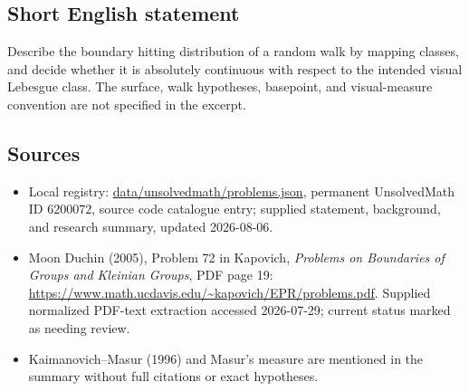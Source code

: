 \documentclass[11pt]{article}
\begin{document}
\subsection{Short English statement}
Describe the boundary hitting distribution of a random walk by mapping classes, and decide whether it is absolutely continuous with respect to the intended visual Lebesgue class. The surface, walk hypotheses, basepoint, and visual-measure convention are not specified in the excerpt.
\subsection{Sources}
\begin{itemize}
\item Local registry: \url{data/unsolvedmath/problems.json}, permanent UnsolvedMath ID \(6200072\), source code catalogue entry; supplied statement, background, and research summary, updated 2026-08-06.
\item Moon Duchin (2005), Problem 72 in Kapovich, \emph{Problems on Boundaries of Groups and Kleinian Groups}, PDF page 19: \url{https://www.math.ucdavis.edu/~kapovich/EPR/problems.pdf}. Supplied normalized PDF-text extraction accessed 2026-07-29; current status marked as needing review.
\item Kaimanovich--Masur (1996) and Masur's measure are mentioned in the summary without full citations or exact hypotheses.
\end{itemize}
\end{document}
